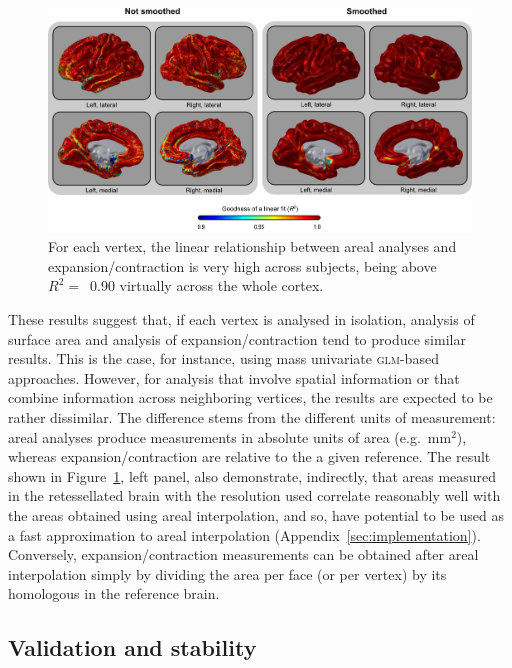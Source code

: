\begin{figure}[!tp]  %
\centering
\includegraphics[width=14cm]{images/spatialfit.png}
\caption[Comparison with expansion/contraction methods (\textsc{iii}).]{For each vertex, the linear relationship between areal analyses and expansion/contraction is very high across subjects, being above $R^2=$~0.90 virtually across the whole cortex.}
\label{fig:spatialfit}
\end{figure}

These results suggest that, if each vertex is analysed in isolation, analysis of surface area and analysis of expansion/contraction tend to produce similar results. This is the case, for instance, using mass univariate \textsc{glm}-based approaches. However, for analysis that involve spatial information or that combine information across neighboring vertices, the results are expected to be rather dissimilar. The difference stems from the different units of measurement: areal analyses produce measurements in absolute units of area (e.g.\ mm$^2$), whereas expansion/contraction are relative to the a given reference. The result shown in Figure~\ref{fig:spatialfit}, left panel, also demonstrate, indirectly, that areas measured in the retessellated brain with the resolution used correlate reasonably well with the areas obtained using areal interpolation, and so, have potential to be used as a fast approximation to areal interpolation (Appendix~\ref{sec:implementation}). Conversely, expansion/contraction measurements can be obtained after areal interpolation simply by dividing the area per face (or per vertex) by its homologous in the reference brain.

\subsection{Validation and stability}

